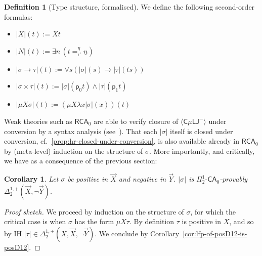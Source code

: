 \documentclass[10pt,a4paper]{amsart}
\theoremstyle{plain}
\newtheorem{corollary}[corollary]{Corollary}
\theoremstyle{definition}
\newtheorem{definition}[definition]{Definition}
\renewcommand{\emptyset}{\varnothing}
\newcommand{\dfn}{:=}
\newcommand{\oldtodo}[1]{\todo{#1}} %
\renewcommand{\todo}[1]{}
\theoremstyle{plain}
\theoremstyle{definition} %
\newcommand{\numeral}[1]{\underline{#1}}
\newcommand{\closure}[1]{\langle #1 \rangle}
\newcommand{\clocmuLJneg}{\closure{\cmuLJneg}}
\newcommand{\nat}{\mathit{N}}
\newcommand{\unit}{1}
\newcommand{\LJ}{\mathsf{LJ}}
\newcommand{\muLJ}{\mu\LJ}
\newcommand{\circular}{\mathsf C}
\newcommand{\cmuLJ}{\circular\muLJ}
\newcommand{\cmuLJneg}{\cmuLJ^-}
\newcommand{\proj}[1]{\mathsf{p}_{#1}}
\newcommand{\identity}{\mathsf{I}}
\newcommand{\enc}[1]{\underline{#1}}
\newcommand{\true}{\mathsf{tt}}
\newcommand{\false}{\mathsf{ff}}
\newcommand{\project}[2]{\mathsf{p}_{#1}(#2)}
\newcommand{\reductionnorec}{\mathrm{r}'}
\newcommand{\convertsnoreceta}{=_{\reductionnorec}^\eta} %
\newcommand{\betae}{=_{\beta}}
\renewcommand{\lor}{\vee}
\renewcommand{\land}{\wedge}
\newcommand{\limp}{\to}
\newcommand{\mufo}[3]{\mu #1 \lambda #2 #3}
\newcommand{\Sin}[2]{\Sigma^{#1}_{#2}}
\newcommand{\Pin}[2]{\Pi^{#1}_{#2}}
\newcommand{\Din}[2]{\Delta^{#1}_{#2}}
\newcommand{\posDin}[3]{\Din{#1,+}{#2} (#3)}
\newcommand{\posnegDin}[4]{\posDin{#1}{#2}{#3, \lnot #4}}
\newcommand{\CA}{\mathsf{CA}}
\newcommand{\ca}[1]{#1\text{-}\CA}
\newcommand{\RCA}{\mathsf R \CA_0}
\newcommand{\PSCA}{\ca{\Pin 1 2 }_0}
\newcommand{\WO}{\mathrm{WO}}
\newcommand{\oper}[3]{\Lambda #1 \lambda #2 \, #3}
\newcommand{\apprx}[4]{(\oper #1 #2 #3)^{#4}}
\newcommand{\hr}[1]{|#1|}
\begin{document}
\begin{definition}
[Type structure, formalised]
We define the following second-order formulas:
\begin{itemize}
    \item $\hr X (t) \dfn Xt$
    \item $\hr \nat (t) \dfn  \exists n\,  (t \convertsnoreceta \numeral n) $ 
    \item $\hr {\sigma \to \tau} (t) \dfn \forall s ( \hr\sigma (s) \limp \hr \tau (ts))$
    \item $\hr{\sigma \times \tau} (t) \dfn \hr \sigma (\proj 0 t) \land \hr \tau (\proj 1 t) $
    \item  $\hr {\mu X \sigma} (t) \dfn (\mufo X x {\hr \sigma (x)}) (t)$
\end{itemize}
\end{definition}

Weak theories such as $\RCA$ are able to verify closure of $\clocmuLJneg$ under conversion by a syntax analysis (see~\cite{Das21:CT-fscd}).
That each $\hr\sigma$ itself is closed under conversion, cf.~\ref{prop:hr-closed-under-conversion}, is also available already in $\RCA$ by (meta-level) induction on the structure of $\sigma$.
More importantly, and critically, we have as a consequence of the previous section:

\begin{corollary}
    \label{cor:hr-is-D12}
    Let $\sigma$ be positive in $\vec X$ and negative in $\vec Y$.
    $\hr \sigma$ is $\PSCA$-provably $\posnegDin 1 2 {\vec X}{\vec Y}$. 
\end{corollary}
\begin{proof}[Proof sketch]
    We proceed by induction on the structure of $\sigma$, for which the critical case is when $\sigma$ has the form $\mu X \tau$.
    By definition $\tau$ is positive in $X$, and so by IH $\hr{\tau} \in \posnegDin 1 2 {X,\vec X}{\vec Y}$.
    We conclude by Corollary~\ref{cor:lfp-of-posD12-is-posD12}.
\end{proof}
\end{document}
